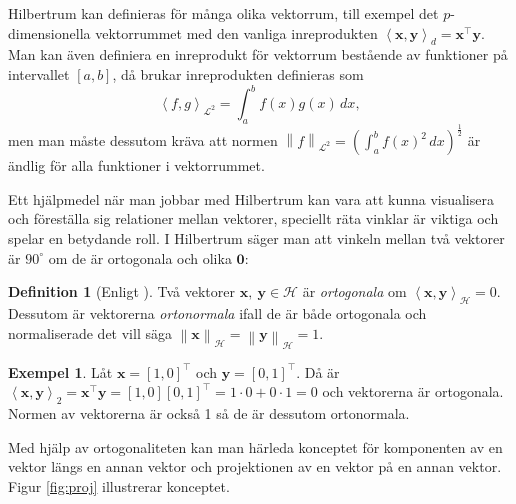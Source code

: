 \documentclass[a4paper, 12pt]{report}
\theoremstyle{definition}
\newtheorem{defi}{Definition}[section]
\newtheorem{ex}{Exempel}[section]
\theoremstyle{remark}
\newcommand{\bfx}{\mathbf{x}}
\newcommand{\bfy}{\mathbf{y}}
\newcommand{\llangle}{\left\langle}
\newcommand{\rrangle}{\right\rangle}
\newcommand{\inner}[2]{\llangle #1, #2 \rrangle}
\newcommand{\hil}{\mathcal{H}}
\begin{document}
Hilbertrum kan definieras för många olika vektorrum, till exempel det \mbox{$p$-dimensionella} vektorrummet med den vanliga inreprodukten $\left\langle \mathbf{x}, \mathbf{y} \right\rangle_d = \mathbf{x}^\intercal\mathbf{y}$.
Man kan även definiera en inreprodukt för vektorrum bestående av funktioner på intervallet $\left[a, b\right]$, då brukar inreprodukten definieras som
\begin{equation*}
\left\langle f, g\right\rangle_{\mathcal{L}^2}=\int_{a}^{b}f\left(x\right)g\left(x\right) \, dx ,
\end{equation*}
men man måste dessutom kräva att normen $\left\|f\right\|_{\mathcal{L}^2} = \left(\int_{a}^{b}f\left(x\right)^2\,dx\right)^{\frac{1}{2}}$ är ändlig för alla funktioner i vektorrummet.

Ett hjälpmedel när man jobbar med Hilbertrum kan vara att kunna visualisera och föreställa sig relationer mellan vektorer, speciellt räta vinklar är viktiga och spelar en betydande roll. I Hilbertrum säger man att vinkeln mellan två vektorer är $90^\circ$ om de är ortogonala och olika $\mathbf{0}$:


\begin{defi}[Enligt \cite{Lang}]
	Två vektorer $\bfx, ~\bfy\in\hil$ är \emph{ortogonala} om $\inner{\bfx}{\bfy}_\hil=0$. Dessutom är vektorerna \emph{ortonormala} ifall de är både ortogonala och normaliserade det vill säga $\left\|\bfx\right\|_\hil=\left\|\bfy\right\|_\hil=1$.
\end{defi}
\begin{ex}%
	Låt $\bfx=\left[1, 0\right]^\intercal$ och $\bfy=\left[0, 1\right]^\intercal$. Då är $\inner{\bfx}{\bfy}_2=\bfx^\intercal\bfy=\left[1, 0\right]\left[0, 1\right]^\intercal = 1\cdot0 + 0\cdot1=0$ och vektorerna är ortogonala. Normen av vektorerna är också 1 så de är dessutom ortonormala.
\end{ex}

Med hjälp av ortogonaliteten kan man härleda konceptet för komponenten av en vektor längs en annan vektor och projektionen av en vektor på en annan vektor.
Figur \ref{fig:proj} illustrerar konceptet.
\end{document}
